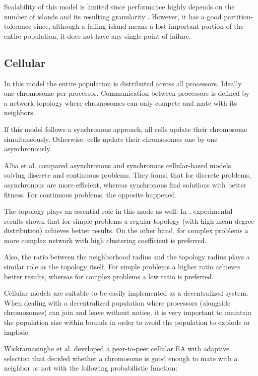 Scalability of this model is limited since performance highly depends on the number of islands and its resulting granularity \cite{58}. However, it has a good partition-tolerance since, although a failing island means a lost important portion of the entire population, it does not have any single-point of failure.

\subsection{Cellular}
In this model the entire population is distributed across all processors. Ideally one chromosome per processor. Communication between processors is defined by a network topology where chromosomes can only compete and mate with its neighbors.

If this model follows a synchronous approach, all cells update their chromosome simultaneously. Otherwise, cells update their chromosomes one by one asynchronously.

Alba et al. \cite{2} compared asynchronous and synchronous cellular-based models, solving discrete and continuous problems. They found that for discrete problems, asynchronous are more efficient, whereas synchronous find solutions with better fitness. For continuous problems, the opposite happened.

The topology plays an essential role in this mode as well. In \cite{68}, experimental results shown that for simple problems a regular topology (with high mean degree distribution) achieves better results. On the other hand, for complex problems a more complex network with high clustering coefficient is preferred.

Also, the ratio between the neighborhood radius and the topology radius plays a similar role as the topology itself. For simple problems a higher ratio achieves better results, whereas for complex problems a low ratio is preferred.\cite{5}

Cellular models are suitable to be easily implemented as a decentralized system. When dealing with a decentralized population where processors (alongside chromosomes) can join and leave without notice, it is very important to maintain the population size within bounds in order to avoid the population to explode or implode. 

Wickramasinghe et al. \cite{p2p-ea} developed a peer-to-peer cellular EA with adaptive selection that decided whether a chromosome is good enough to mate with a neighbor or not with the following probabilistic function:

